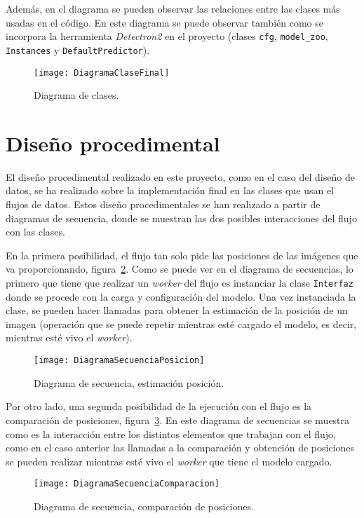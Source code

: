 Además, en el diagrama se pueden observar las relaciones entre las clases más usadas en el código. En este diagrama se puede observar también como se incorpora la herramienta \textit{Detectron2} en el proyecto (clases \texttt{cfg}, \texttt{model\_zoo}, \texttt{Instances} y \texttt{DefaultPredictor}).

\begin{landscape}
	\begin{figure}[h]
		\centering
		\texttt{[image: DiagramaClaseFinal]}
		\caption{Diagrama de clases.}
		\label{fig:diacla}
	\end{figure}	
\end{landscape}

\section{Diseño procedimental}

El diseño procedimental realizado en este proyecto, como en el caso del diseño de datos, se ha realizado sobre la implementación final en las clases que usan el flujos de datos. Estos diseño procedimentales se han realizado a partir de diagramas de secuencia, donde se muestran las dos posibles interacciones del flujo con las clases.

En la primera posibilidad, el flujo tan solo pide las posiciones de las imágenes que va proporcionando, figura~\ref{fig:diasec1}. Como se puede ver en el diagrama de secuencias, lo primero que tiene que realizar un \textit{worker} del flujo es instanciar la clase \texttt{Interfaz} donde se procede con la carga y configuración del modelo. Una vez instanciada la clase, se pueden hacer llamadas para obtener la estimación de la posición de un imagen (operación que se puede repetir mientras esté cargado el modelo, es decir, mientras esté vivo el \textit{worker}).

\begin{figure}[h]
	\centering
	\texttt{[image: DiagramaSecuenciaPosicion]}
	\caption{Diagrama de secuencia, estimación posición.}
	\label{fig:diasec1}
\end{figure}

Por otro lado, una segunda posibilidad de la ejecución con el flujo es la comparación de posiciones, figura~\ref{fig:diasec2}. En este diagrama de secuencias se muestra como es la interacción entre los distintos elementos que trabajan con el flujo, como en el caso anterior las llamadas a la comparación y obtención de posiciones se pueden realizar mientras esté vivo el \textit{worker} que tiene el modelo cargado.

\begin{figure}[h]
	\centering
	\texttt{[image: DiagramaSecuenciaComparacion]}
	\caption{Diagrama de secuencia, comparación de posiciones.}
	\label{fig:diasec2}
\end{figure}


